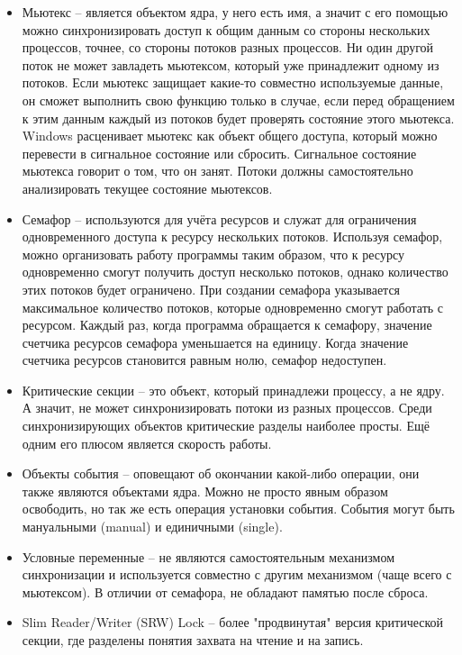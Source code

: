 \documentclass[a4paper, 12pt]{article}		%
\begin{document}
\begin{itemize}
\item Мьютекс -- является объектом ядра, у него есть имя, а значит с его помощью можно синхронизировать доступ к общим данным со стороны нескольких процессов, точнее, со стороны потоков разных процессов. Ни один другой поток не может завладеть мьютексом, который уже принадлежит одному из потоков. Если мьютекс защищает какие-то совместно используемые данные, он сможет выполнить свою функцию только в случае, если перед обращением к этим данным каждый из потоков будет проверять состояние этого мьютекса. Windows расценивает мьютекс как объект общего доступа, который можно перевести в сигнальное состояние или сбросить. Сигнальное состояние мьютекса говорит о том, что он занят. Потоки должны самостоятельно анализировать текущее состояние мьютексов.
\item Семафор -- используются для учёта ресурсов и служат для ограничения одновременного доступа к ресурсу нескольких потоков. Используя семафор, можно организовать работу программы таким образом, что к ресурсу одновременно смогут получить доступ несколько потоков, однако количество этих потоков будет ограничено. При создании семафора указывается максимальное количество потоков, которые одновременно смогут работать с ресурсом. Каждый раз, когда программа обращается к семафору, значение счетчика ресурсов семафора уменьшается на единицу. Когда значение счетчика ресурсов становится равным нолю, семафор недоступен.
\item Критические секции -- это объект, который принадлежи процессу, а не ядру. А значит, не может синхронизировать потоки из разных процессов. Среди синхронизирующих объектов критические разделы наиболее просты. Ещё одним его плюсом является скорость работы.
\item Объекты события -- оповещают об окончании какой-либо операции, они также являются объектами ядра. Можно не просто явным образом освободить, но так же есть операция установки события. События могут быть мануальными (manual) и единичными (single).
\item Условные переменные -- не являются самостоятельным механизмом синхронизации и используется совместно с другим механизмом (чаще всего с мьютексом). В отличии от семафора, не обладают памятью после сброса.
\item Slim Reader/Writer (SRW) Lock -- более "продвинутая" версия критической секции, где разделены понятия захвата на чтение и на запись.
\end{itemize}
\end{document}
